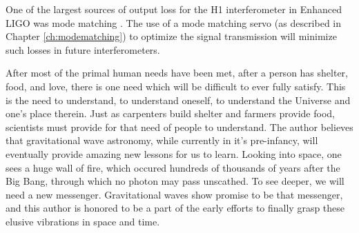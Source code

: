 One of the largest sources of output loss for the H1 interferometer in Enhanced LIGO was mode matching \cite{Tobin}. %
The use of a mode matching servo (as described in Chapter \ref{ch:modematching}) to optimize the signal transmission will minimize such losses in future interferometers.

After most of the primal human needs have been met, after a person has shelter, food, and love, there is one need which will be difficult to ever fully satisfy. %
This is the need to understand, to understand oneself, to understand the Universe and one's place therein. %
Just as carpenters build shelter and farmers provide food, scientists must provide for that need of people to understand. %
The author believes that gravitational wave astronomy, while currently in it's pre-infancy, will eventually provide amazing new lessons for us to learn. %
Looking into space, one sees a huge wall of fire, which occured hundreds of thousands of years after the Big Bang, through which no photon may pass unscathed. %
To see deeper, we will need a new messenger. %
Gravitational waves show promise to be that messenger, and this author is honored to be a part of the early efforts to finally grasp these elusive vibrations in space and time.
